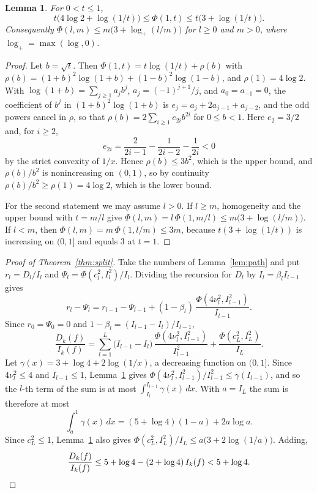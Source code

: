 \documentclass[11pt]{amsart}
\newtheorem{lemma}[theorem]{Lemma}
\theoremstyle{definition}\newtheorem{definition}[theorem]{Definition}
\theoremstyle{remark}\newtheorem{remark}[theorem]{Remark}
\begin{document}
\begin{lemma}\label{lem:phi}
For $0<t\le1$,
\[
t\bigl(4\log2+\log(1/t)\bigr)\le\Phi(1,t)\le t\bigl(3+\log(1/t)\bigr).
\]
Consequently $\Phi(l,m)\le m\bigl(3+\log_+(l/m)\bigr)$ for $l\ge0$ and $m>0$, where $\log_+=\max(\log,0)$.
\end{lemma}

\begin{proof}
Let $b=\sqrt t$. Then $\Phi(1,t)=t\log(1/t)+\rho(b)$ with $\rho(b)=(1+b)^2\log(1+b)+(1-b)^2\log(1-b)$, and
$\rho(1)=4\log2$. With $\log(1+b)=\sum_{j\ge1}a_jb^j$, $a_j=(-1)^{j+1}/j$, and $a_0=a_{-1}=0$, the coefficient of $b^j$
in $(1+b)^2\log(1+b)$ is $e_j=a_j+2a_{j-1}+a_{j-2}$, and the odd powers cancel in $\rho$, so that
$\rho(b)=2\sum_{i\ge1}e_{2i}b^{2i}$ for $0\le b<1$. Here $e_2=3/2$ and, for $i\ge2$,
\[
e_{2i}=\frac{2}{2i-1}-\frac1{2i-2}-\frac1{2i}<0
\]
by the strict convexity of $1/x$. Hence $\rho(b)\le3b^2$, which is the upper bound, and $\rho(b)/b^2$ is nonincreasing
on $(0,1)$, so by continuity $\rho(b)/b^2\ge\rho(1)=4\log 2$, which is the lower bound.

For the second statement we may assume $l>0$. If $l\ge m$, homogeneity and the upper bound with $t=m/l$ give
$\Phi(l,m)=l\,\Phi(1,m/l)\le m\bigl(3+\log(l/m)\bigr)$. If $l<m$, then $\Phi(l,m)=m\,\Phi(1,l/m)\le3m$, because
$t(3+\log(1/t))$ is increasing on $(0,1]$ and equals $3$ at $t=1$.
\end{proof}

\begin{proof}[Proof of Theorem~\ref{thm:split}]
Take the numbers of Lemma~\ref{lem:path} and put $r_l=D_l/I_l$ and $\Psi_l=\Phi(c_l^2,I_l^2)/I_l$. Dividing the
recursion for $D_l$ by $I_l=\beta_lI_{l-1}$ gives
\[
r_l-\Psi_l=r_{l-1}-\Psi_{l-1}+(1-\beta_l)\,\frac{\Phi(4\nu_l^2,I_{l-1}^2)}{I_{l-1}}.
\]
Since $r_0=\Psi_0=0$ and $1-\beta_l=(I_{l-1}-I_l)/I_{l-1}$,
\begin{equation}\label{eq:tele}
\frac{D_k(f)}{I_k(f)}=\sum_{l=1}^L\bigl(I_{l-1}-I_l\bigr)\,\frac{\Phi(4\nu_l^2,I_{l-1}^2)}{I_{l-1}^2}
+\frac{\Phi(c_L^2,I_L^2)}{I_L}.
\end{equation}
Let $\gamma(x)=3+\log4+2\log(1/x)$, a decreasing function on $(0,1]$. Since $4\nu_l^2\le4$ and $I_{l-1}\le1$,
Lemma~\ref{lem:phi} gives $\Phi(4\nu_l^2,I_{l-1}^2)/I_{l-1}^2\le\gamma(I_{l-1})$, and so the $l$-th term of the sum is
at most $\int_{I_l}^{I_{l-1}}\gamma(x)\,dx$. With $a=I_L$ the sum is therefore at most
\[
\int_a^1\gamma(x)\,dx=(5+\log4)(1-a)+2a\log a .
\]
Since $c_L^2\le1$, Lemma~\ref{lem:phi} also gives $\Phi(c_L^2,I_L^2)/I_L\le a\bigl(3+2\log(1/a)\bigr)$. Adding,
\[
\frac{D_k(f)}{I_k(f)}\le5+\log4-(2+\log4)\,I_k(f)<5+\log4. \qedhere
\]
\end{proof}
\end{document}
